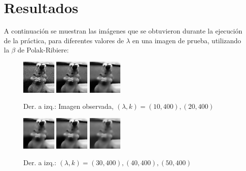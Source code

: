 \documentclass[10pt,journal,compsoc]{styles/IEEEtran}
\begin{document}
\section{Resultados}

A continuación se muestran las imágenes que se obtuvieron durante la ejecución de la práctica, para diferentes valores de $\lambda$ en una imagen de prueba, utilizando la $\beta$ de Polak-Ribiere:\\

\begin{figure}[H]
	\centering
	\includegraphics[width=0.15\textwidth]{ardilla.png}
	\includegraphics[width=0.15\textwidth]{PR10K400.png}
	\includegraphics[width=0.15\textwidth]{PR20K400.png}
	
	\caption{Der. a izq.: Imagen observada, $(\lambda,k)=(10,400),(20,400)$}
\end{figure}

\begin{figure}[H]
	\centering
	\includegraphics[width=0.15\textwidth]{PR30K400.png}
	\includegraphics[width=0.15\textwidth]{PR40K400.png}
	\includegraphics[width=0.15\textwidth]{PR50K400.png}
	
	\caption{Der. a izq.: $(\lambda,k)=(30,400),(40,400),(50,400)$ }
\end{figure}
\end{document}
